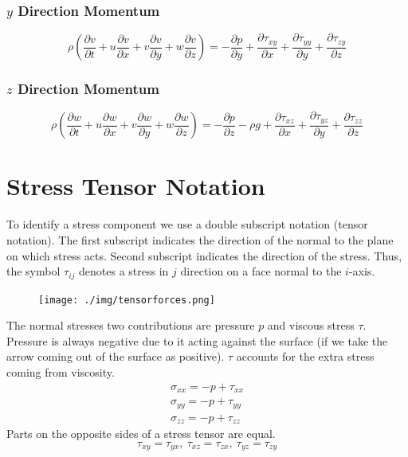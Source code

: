 \subsubsection{$y$ Direction Momentum}
\begin{equation}
  \rho \left( \frac{\partial v}{\partial t} + u \frac{\partial v}{\partial x} + v \frac{\partial v}{\partial y} + w \frac{\partial v}{\partial z} \right) = -\frac{\partial p}{\partial y} + \frac{\partial \tau_{xy}}{\partial x} + \frac{\partial \tau_{yy}}{\partial y} + \frac{\partial \tau_{zy}}{\partial z}
\end{equation}
\subsubsection{$z$ Direction Momentum}
\begin{equation}
  \rho \left( \frac{\partial w}{\partial t} + u \frac{\partial w}{\partial x} + v \frac{\partial w}{\partial y} + w \frac{\partial w}{\partial z} \right) = -\frac{\partial p}{\partial z} -\rho g + \frac{\partial \tau_{xz}}{\partial x} + \frac{\partial \tau_{yz}}{\partial y} + \frac{\partial \tau_{zz}}{\partial z}
\end{equation}
\section{Stress Tensor Notation}
To identify a stress component we use a double subscript notation (tensor notation). The first subscript indicates the direction of the normal to the plane on which stress acts. Second subscript indicates the direction of the stress. Thus, the symbol $\tau_{ij}$ denotes a stress in $j$ direction on a face normal to the $i$-axis.
\begin{figure}[H]
  \centering
  \texttt{[image: ./img/tensorforces.png]}
\end{figure}
The normal stresses two contributions are pressure $p$ and viscous stress $\tau$. Pressure is always negative due to it acting against the surface (if we take the arrow coming out of the surface as positive). $\tau$ accounts for the extra stress coming from viscosity.
\begin{gather}
  \sigma_{xx} = -p + \tau_{xx}\\
  \sigma_{yy} = -p + \tau_{yy}\\
  \sigma_{zz} = -p + \tau_{zz}
\end{gather}
Parts on the opposite sides of a stress tensor are equal.
$$ \tau_{xy} = \tau_{yx}, \ \tau_{xz} = \tau_{zx}, \ \tau_{yz} = \tau_{zy} $$